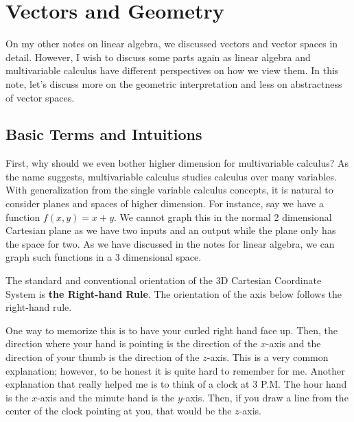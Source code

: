 \documentclass[../../main.tex]{subfiles}
\begin{document}
\chapter{Vectors and Geometry}

On my other notes on linear algebra, we discussed vectors and
vector spaces in detail. However, I wish to discuss some parts
again as linear algebra and multivariable calculus have different
perspectives on how we view them. In this note, let's discuss
more on the geometric interpretation and less on abstractness
of vector spaces.

\section{Basic Terms and Intuitions}

First, why should we even bother higher dimension for multivariable
calculus? As the name suggests, multivariable calculus studies
calculus over many variables. With generalization from the single
variable calculus concepts, it is natural to consider planes and
spaces of higher dimension. For instance, say we have a function
$f(x, y) = x + y$. We cannot graph this in the normal 2 dimensional
Cartesian plane as we have two inputs and an output while the plane
only has the space for two. As we have discussed in the notes for
linear algebra, we can graph such functions in a 3 dimensional
space.

The standard and conventional orientation of the 3D Cartesian
Coordinate System is \textbf{the Right-hand Rule}. The orientation
of the axis below follows the right-hand rule.

\begin{figure}[H]
\centering
{}
\end{figure}

One way to memorize this is to have your curled right hand face up.
Then, the direction where your hand is pointing is the direction of
the $x$-axis and the direction of your thumb is the direction of the
$z$-axis. This is a very common explanation; however, to be honest
it is quite hard to remember for me. Another explanation that really
helped me is to think of a clock at 3 P.M. The hour hand is the
$x$-axis and the minute hand is the $y$-axis. Then, if you draw
a line from the center of the clock pointing at you, that would
be the $z$-axis.
\end{document}
